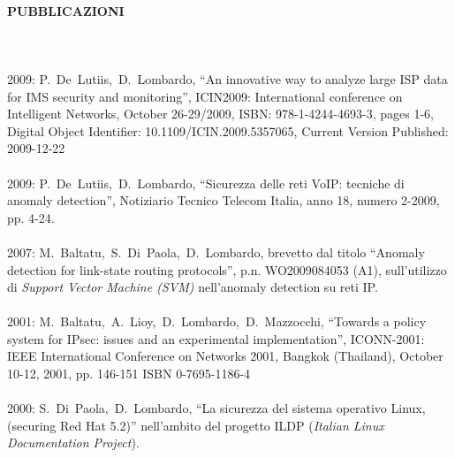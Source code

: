 \documentclass[a4paper, 10pt]{article}
\begin{document}
\paragraph{PUBBLICAZIONI}
\ \\
\ \\
2009: \mbox{P. De Lutiis, D. Lombardo}, ``An innovative way to analyze large ISP 
data for IMS security and monitoring'', ICIN2009: International conference on 
Intelligent Networks, October 26-29/2009, ISBN: 978-1-4244-4693-3, pages 1-6, 
Digital Object Identifier: 10.1109/ICIN.2009.5357065, Current Version Published: 
2009-12-22 
\\
\ \\
2009: \mbox{P. De Lutiis, D. Lombardo}, ``Sicurezza delle reti VoIP: tecniche di 
anomaly detection'', Notiziario Tecnico Telecom Italia, anno 18, numero 2-2009, pp.
4-24.
\\
\ \\
2007: \mbox{M. Baltatu, S. Di Paola, D. Lombardo}, brevetto dal titolo ``Anomaly
detection for link-state routing protocols'', p.n. WO2009084053 (A1), 
sull'utilizzo di \emph{Support Vector Machine (SVM)} nell'anomaly detection su
reti IP.
\\
\ \\
2001: \mbox{M. Baltatu, A. Lioy, D. Lombardo, D. Mazzocchi}, ``Towards a policy 
system for IPsec: issues and an experimental implementation'', ICONN-2001: IEEE 
International Conference on Networks 2001, Bangkok (Thailand), October 10-12, 
2001, pp. 146-151 ISBN 0-7695-1186-4 
\\
\ \\
2000: \mbox{S. Di Paola, D. Lombardo}, ``La sicurezza del sistema operativo 
Linux, (securing Red Hat 5.2)'' nell'ambito del progetto ILDP (\emph{Italian 
Linux Documentation Project}).
\\
\end{document}
